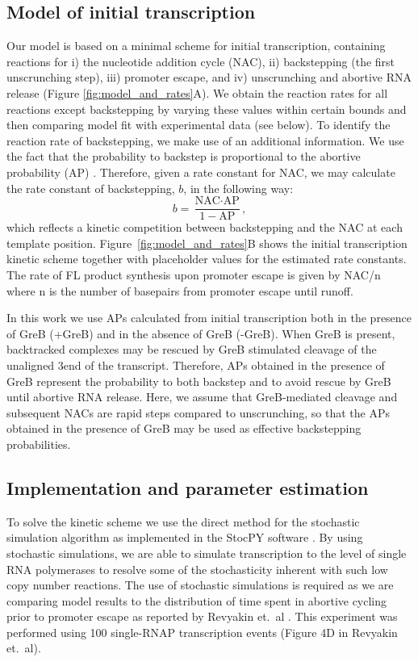 %
\subsection{Model of initial transcription}
Our model is based on a minimal scheme for initial transcription, containing
reactions for i) the nucleotide addition cycle (NAC), ii) backstepping (the
first unscrunching step), iii) promoter escape, and iv) unscrunching and
abortive RNA release (Figure \ref{fig:model_and_rates}A). We obtain the
reaction rates for all reactions except backstepping by varying these values
within certain bounds and then comparing model fit with experimental data (see
below). To identify the reaction rate of backstepping, we make use of an
additional information. We use the fact that the probability to backstep is
proportional to the abortive probability (AP) \cite{hsu_quantitative_1996}.
Therefore, given a rate constant for NAC, we may calculate the rate constant
of backstepping, $b$, in the following way:
\begin{equation*}
  b = \frac{\text{NAC}\cdot\text{AP}}{1-\text{AP}},
\end{equation*}
which reflects a kinetic competition between backstepping and the NAC at each
template position. Figure~\ref{fig:model_and_rates}B shows the initial
transcription kinetic scheme together with placeholder values for the
estimated rate constants. The rate of FL product synthesis upon promoter
escape is given by NAC/n where n is the number of basepairs from promoter
escape until runoff.

In this work we use APs calculated from initial transcription both in the
presence of GreB (+GreB) and in the absence of GreB (-GreB). When GreB is
present, backtracked complexes may be rescued by GreB stimulated cleavage of
the unaligned 3\ppp end of the transcript. Therefore, APs obtained in the
presence of GreB represent the probability to both backstep and to avoid
rescue by GreB until abortive RNA release. Here, we assume that GreB-mediated
cleavage and subsequent NACs are rapid steps compared to unscrunching, so that
the APs obtained in the presence of GreB may be used as effective backstepping
probabilities.

\subsection{Implementation and parameter estimation}
To solve the kinetic scheme we use the direct method for the stochastic
simulation algorithm \cite{gillespie_exact_1977} as implemented in the StocPY
software \cite{maarleveld_stochpy:_2013}. By using stochastic simulations, we
are able to simulate transcription to the level of single RNA polymerases to
resolve some of the stochasticity inherent with such low copy number
reactions. The use of stochastic simulations is required as we are comparing
model results to the distribution of time spent in abortive cycling prior to
promoter escape as reported by Revyakin et.\ al \cite{revyakin_abortive_2006}.
This experiment was performed using 100 single-RNAP transcription events
(Figure 4D in Revyakin et.\ al).


